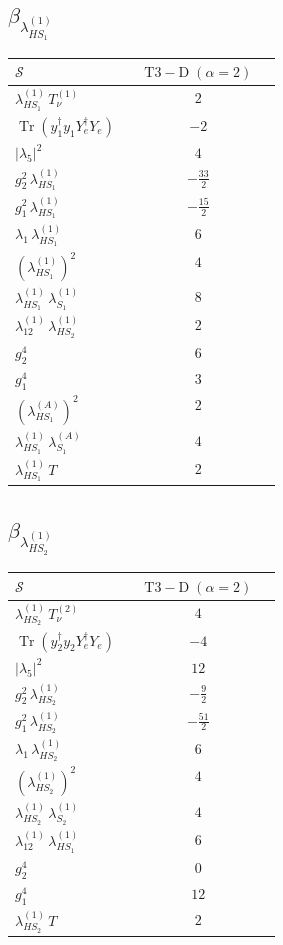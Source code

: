 \documentclass[9pt]{article}
\begin{document}
\subsection*{$ \beta_{\lambda_{HS_1}^{(1)}} $}
\begin{longtable}{@{}p{0.31\linewidth}c@{}}
\toprule
$\mathcal{S}$ & $ \mathrm{T3-D}\;(\alpha=2) $ \\
\midrule
$ \lambda_{HS_1}^{(1)}\,T_{\nu}^{(1)} $ & $ 2 $ \\
$ \operatorname{Tr}(y_1^\dagger y_1Y_e^\dagger Y_e) $ & $ -2 $ \\
$ |\lambda_5|^2 $ & $ 4 $ \\
$ g_2^2\,\lambda_{HS_1}^{(1)} $ & $ - \frac{33}{2} $ \\
$ g_1^2\,\lambda_{HS_1}^{(1)} $ & $ - \frac{15}{2} $ \\
$ \lambda_1\,\lambda_{HS_1}^{(1)} $ & $ 6 $ \\
$ \left(\lambda_{HS_1}^{(1)}\right)^2 $ & $ 4 $ \\
$ \lambda_{HS_1}^{(1)}\,\lambda_{S_1}^{(1)} $ & $ 8 $ \\
$ \lambda_{12}^{(1)}\,\lambda_{HS_2}^{(1)} $ & $ 2 $ \\
$ g_2^4 $ & $ 6 $ \\
$ g_1^4 $ & $ 3 $ \\
$ \left(\lambda_{HS_1}^{(A)}\right)^2 $ & $ 2 $ \\
$ \lambda_{HS_1}^{(1)}\,\lambda_{S_1}^{(A)} $ & $ 4 $ \\
$ \lambda_{HS_1}^{(1)}\,T $ & $ 2 $ \\
\bottomrule
\end{longtable}
\subsection*{$ \beta_{\lambda_{HS_2}^{(1)}} $}
\begin{longtable}{@{}p{0.31\linewidth}c@{}}
\toprule
$\mathcal{S}$ & $ \mathrm{T3-D}\;(\alpha=2) $ \\
\midrule
$ \lambda_{HS_2}^{(1)}\,T_{\nu}^{(2)} $ & $ 4 $ \\
$ \operatorname{Tr}(y_2^\dagger y_2Y_e^\dagger Y_e) $ & $ -4 $ \\
$ |\lambda_5|^2 $ & $ 12 $ \\
$ g_2^2\,\lambda_{HS_2}^{(1)} $ & $ - \frac{9}{2} $ \\
$ g_1^2\,\lambda_{HS_2}^{(1)} $ & $ - \frac{51}{2} $ \\
$ \lambda_1\,\lambda_{HS_2}^{(1)} $ & $ 6 $ \\
$ \left(\lambda_{HS_2}^{(1)}\right)^2 $ & $ 4 $ \\
$ \lambda_{HS_2}^{(1)}\,\lambda_{S_2}^{(1)} $ & $ 4 $ \\
$ \lambda_{12}^{(1)}\,\lambda_{HS_1}^{(1)} $ & $ 6 $ \\
$ g_2^4 $ & $ 0 $ \\
$ g_1^4 $ & $ 12 $ \\
$ \lambda_{HS_2}^{(1)}\,T $ & $ 2 $ \\
\bottomrule
\end{longtable}
\end{document}
